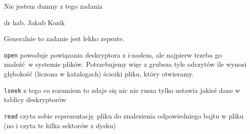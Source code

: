 \epigraph{Nie jestem dumny z tego zadania}{dr hab. Jakub Kozik}

Generalnie to zadanie jest lekko zepsute.

\texttt{open} powoduje powiązania deskryptora z i-nodem, ale najpierw trzeba go znaleźć w systemie plików.
Potrzebujemy więc z grubsza tyle odczytów ile wynosi głębokość (liczona w katalogach) ścieżki pliku, który otwieramy.

\texttt{lseek} z tego co rozumiem to zdaje się nic nie rusza tylko ustawia jakieś dane w tablicy deskryptorów

\texttt{read} czyta sobie reprezentację pliku do znalezienia odpowiedniego bajtu w pliku (no i czyta te kilka sektorów z dysku)